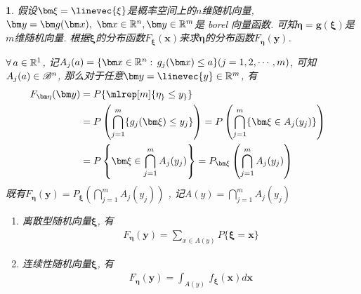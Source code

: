 \def\etaAy#1{\eta_{#1}\le y_{#1}}
\newtheorem{distribution_function_of_function_of_random_vector}[theorem_root]{\theorem}
\begin{distribution_function_of_function_of_random_vector}
    假设\(\bm\xi = \linevec{\xi}\)是概率空间\prbsp 上的\(n\)维随机向量, 
    \(\bm y = \bm g(\bm x),\,\,\bm x\in\Rs^n, \bm y\in\Rs^m\)是 borel 向量函数.
    可知\(\bm\eta = \bm g(\bm\xi)\)是\(m\)维随机向量.
    根据\(\bm\xi\)的分布函数\(F_{\bm\xi}(\bm x)\)来求\(\bm\eta\)的分布函数\(F_{\bm\eta}(\bm y)\).

    \(\forall\,a\in\Rs^1\), 记\(A_j(a) = \{\bm x\in\Rs^n:\, g_j(\bm x)\le a\}(j = 1, 2, \cdots, m)\), 
    可知\(A_j(a)\in\sgmb^n\), 那么对于任意\(\bm y = \linevec{y}\in\Rs^m\), 有
    \begin{align}
        F_{\bm\eta}(\bm y) &= P\{\mlrep[m]{\etaAy}\} \cr
        &= P\left(\bigcap\limits_{j = 1}^{m}\{g_j(\bm\xi)\le y_j\}\right) = 
        P\left(\bigcap\limits_{j = 1}^{m}\{\bm\xi\in A_j(y_j)\}\right)\cr
        &= P\left\{\bm\xi\in\bigcap\limits_{j=1}^{m}A_j(y_j)\right\}
        = P_{\bm\xi}\left(\bigcap\limits_{j=1}^{m}A_j(y_j)\right)
    \end{align}
    既有\(F_{\bm\eta}(\bm y) = 
        P_{\bm\xi}\left(\bigcap\limits_{j=1}^{m}A_j(y_j)\right)\)
    , 记\(A(y) = \bigcap\limits_{j=1}^{m}A_j(y_j)\)
    \begin{enumerate}
    \item 离散型随机向量\(\bm\xi\), 有
    \begin{align}
        F_{\bm\eta}(\bm y) = \sum\limits_{x\in A(y)}P\{\bm\xi = \bm x\}
    \end{align}
    \item 连续性随机向量\(\bm\xi\), 有
    \begin{align}
        F_{\bm\eta}(\bm y) = \int_{A(y)}\,f_{\bm\xi}(\bm x)d\bm x
    \end{align}
    \end{enumerate}
\end{distribution_function_of_function_of_random_vector}

\newtheorem{addtion_of_two_random_var}[theorem_root]{\lemma}
\newtheorem{subtraction_of_two_random_var}[theorem_root]{\lemma}
\newtheorem{multiplication_of_two_random_var}[theorem_root]{\lemma}
\newtheorem{division_of_two_random_var}[theorem_root]{\lemma}

